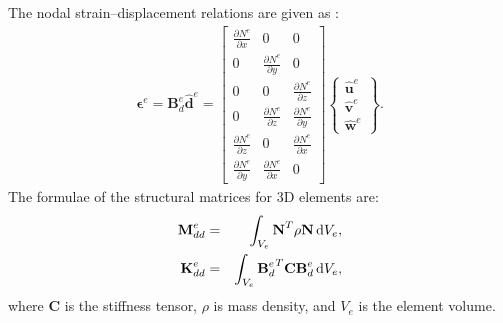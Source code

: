 The nodal strain--displacement relations are given as \cite{kudela20093d}:
\begin{eqnarray}
	\boldsymbol{\epsilon}^e=\textbf{B}_{d}^e\widehat{\textbf{d}}^e=
	\left [
	\begin{array}{ccc}
		\frac{\partial N^e}{\partial x} & 0 & 0\\
		0 & \frac{\partial N^e}{\partial y} & 0\\
		0 & 0 & \frac{\partial N^e}{\partial z}\\
		0 & \frac{\partial N^e}{\partial z} & \frac{\partial N^e}{\partial y}\\
		\frac{\partial N^e}{\partial z} & 0 & \frac{\partial N^e}{\partial x}\\
		\frac{\partial N^e}{\partial y} & \frac{\partial N^e}{\partial x} & 0
	\end{array} \right]
	\left \{ \begin{array}{c}
		\widehat{\textbf{u}}^e \\
		\widehat{\textbf{v}}^e \\
		\widehat{\textbf{w}}^e
	\end{array} \right\}.
\end{eqnarray}
The formulae of the structural matrices for 3D elements are:
\begin{eqnarray}
	\textbf{M}_{dd}^e & = & \int_{V_e}\textbf{N}^T\rho \textbf{N} \mathop{}\!\mathrm{d} V_e,\\
	\textbf{K}_{dd}^e & = & \int_{V_e}{\textbf{B}_d^e}^T\textbf{C}\textbf{B}_d^e \mathop{}\!\mathrm{d} V_e,
\end{eqnarray}
where \textbf{C} is the stiffness tensor, \(\rho\) is mass density, and \(V_e\) is the element volume.